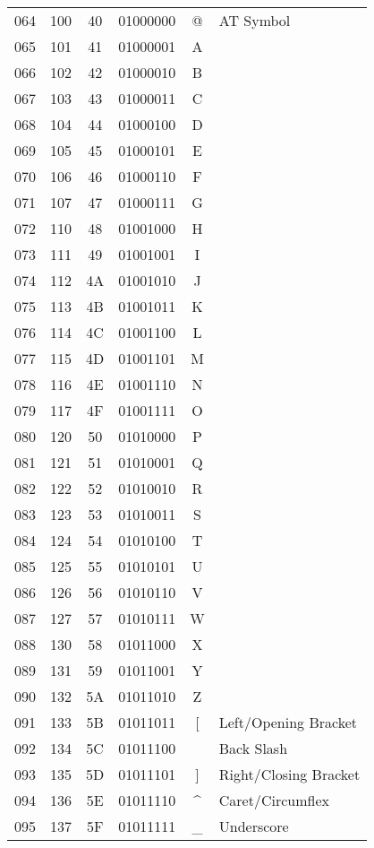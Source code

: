 \documentclass{article}
\begin{document}
\begin{longtable}{|c|c|c|c|c|l|}
       064 & 100 & 40 & 01000000 & @   & AT Symbol\\
       065 & 101 & 41 & 01000001 & A   & \\
       066 & 102 & 42 & 01000010 & B   & \\
       067 & 103 & 43 & 01000011 & C   & \\
       068 & 104 & 44 & 01000100 & D   & \\
       069 & 105 & 45 & 01000101 & E   & \\
       070 & 106 & 46 & 01000110 & F   & \\
       071 & 107 & 47 & 01000111 & G   & \\
       072 & 110 & 48 & 01001000 & H   & \\
       073 & 111 & 49 & 01001001 & I   & \\
       074 & 112 & 4A & 01001010 & J   & \\
       075 & 113 & 4B & 01001011 & K   & \\
       076 & 114 & 4C & 01001100 & L   & \\
       077 & 115 & 4D & 01001101 & M   & \\
       078 & 116 & 4E & 01001110 & N   & \\
       079 & 117 & 4F & 01001111 & O   & \\
       080 & 120 & 50 & 01010000 & P   & \\
       081 & 121 & 51 & 01010001 & Q   & \\
       082 & 122 & 52 & 01010010 & R   & \\
       083 & 123 & 53 & 01010011 & S   & \\
       084 & 124 & 54 & 01010100 & T   & \\
       085 & 125 & 55 & 01010101 & U   & \\
       086 & 126 & 56 & 01010110 & V   & \\
       087 & 127 & 57 & 01010111 & W   & \\
       088 & 130 & 58 & 01011000 & X   & \\
       089 & 131 & 59 & 01011001 & Y   & \\
       090 & 132 & 5A & 01011010 & Z   & \\
       091 & 133 & 5B & 01011011 & [   & Left/Opening Bracket\\
       092 & 134 & 5C & 01011100 & \   & Back Slash\\
       093 & 135 & 5D & 01011101 & ]   & Right/Closing Bracket\\
       094 & 136 & 5E & 01011110 & \textasciicircum   & Caret/Circumflex\\
       095 & 137 & 5F & 01011111 & \_   & Underscore\\


\end{longtable}
\end{document}
